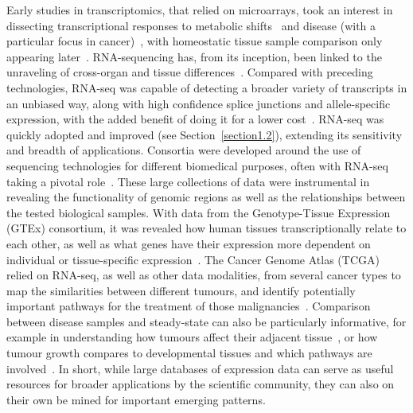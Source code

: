 Early studies in transcriptomics, that relied on microarrays, took an interest in dissecting transcriptional responses to metabolic shifts~\citep{derisi_exploring_1997} and disease (with a particular focus in cancer)~\citep{rhodes_large-scale_2004}, with homeostatic tissue sample comparison only appearing later~\citep{shyamsundar_dna_2005}. 
RNA-sequencing has, from its inception, been linked to the unraveling of cross-organ and tissue differences~\citep{mortazavi_mapping_2008}. Compared with preceding technologies, RNA-seq was capable of detecting a broader variety of transcripts in an unbiased way, along with high confidence splice junctions and allele-specific expression, with the added benefit of doing it for a lower cost~\citep{wang_rna-seq:_2009}. RNA-seq was quickly adopted and improved (see Section~\ref{section1.2}), extending its sensitivity and breadth of applications. Consortia were developed around the use of sequencing technologies for different biomedical purposes, often with RNA-seq taking a pivotal role~\citep{the_cancer_genome_atlas_research_network_cancer_2013,the_encode_project_consortium_integrated_2012,lonsdale_genotype-tissue_2013}. These large collections of data were instrumental in revealing the functionality of genomic regions as well as the relationships between the tested biological samples. With data from the Genotype-Tissue Expression (GTEx) consortium, it was revealed how human tissues transcriptionally relate to each other, as well as what genes have their expression more dependent on individual or tissue-specific expression~\citep{mele_human_2015}. The Cancer Genome Atlas (TCGA) relied on RNA-seq, as well as other data modalities, from several cancer types to map the similarities between different tumours, and identify potentially important pathways for the treatment of those malignancies~\citep{hoadley_cell--origin_2018}. Comparison between disease samples and steady-state can also be particularly informative, for example in understanding how tumours affect their adjacent tissue~\citep{aran_comprehensive_2017}, or how tumour growth compares to developmental tissues and which pathways are involved~\citep{young_single-cell_2018}. In short, while large databases of expression data can serve as useful resources for broader applications by the scientific community, they can also on their own be mined for important emerging patterns.

